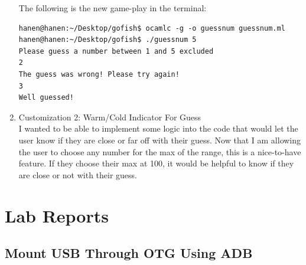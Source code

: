\begin{enumerate}
The following is the new game-play in the terminal:
\begin{verbatim}
hanen@hanen:~/Desktop/gofish$ ocamlc -g -o guessnum guessnum.ml
hanen@hanen:~/Desktop/gofish$ ./guessnum 5
Please guess a number between 1 and 5 excluded 
2
The guess was wrong! Please try again!
3
Well guessed!
\end{verbatim}

\item Customization 2: Warm/Cold Indicator For Guess \\I wanted to be able to implement some logic into the code that would let the user know if they are close or far off with their guess. Now that I am allowing the user to choose any number for the max of the range, this is a nice-to-have feature. If they choose their max at 100, it would be helpful to know if they are close or not with their guess.
\end{enumerate}
\chapter{Lab Reports}
\label{labreports}

\section{Mount USB Through OTG Using ADB}

